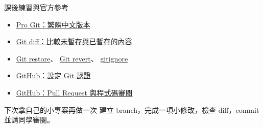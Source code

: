 \documentclass[xetex, unicode, 10pt, aspectratio=169]{beamer}
\begin{document}
\begin{frame}{課後練習與官方參考}
    \begin{itemize}
        \item \href{https://git-scm.com/book/zh-tw/v2}{Pro Git：繁體中文版本}
        \item \href{https://git-scm.com/docs/git-diff}{Git diff：比較未暫存與已暫存的內容}
        \item \href{https://git-scm.com/docs/git-restore}{Git restore}、
            \href{https://git-scm.com/docs/git-revert}{Git revert}、
            \href{https://git-scm.com/docs/gitignore}{gitignore}
        \item \href{https://docs.github.com/en/get-started/git-basics/caching-your-github-credentials-in-git}{GitHub：設定 Git 認證}
        \item \href{https://docs.github.com/en/pull-requests}{GitHub：Pull Request 與程式碼審閱}
    \end{itemize}
    \begin{block}{下次拿自己的小專案再做一次}
        建立 branch，完成一項小修改，檢查 diff，commit 並請同學審閱。
    \end{block}
\end{frame}
\end{document}

